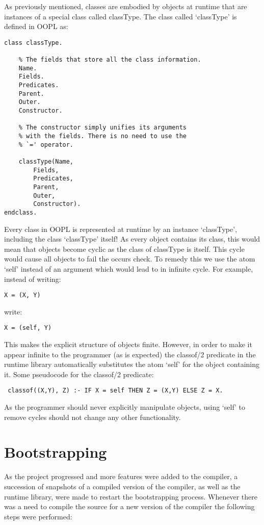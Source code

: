 \documentclass[12pt,a4paper,twoside,openright]{report}
\begin{document}
As previously mentioned, classes are embodied by objects at runtime that are instances of a special class called classType. The class called `classType' is defined in OOPL as:

\begin{lstlisting}
class classType.

	% The fields that store all the class information.
	Name.
	Fields.
	Predicates.
	Parent.
	Outer.
	Constructor.
	
	% The constructor simply unifies its arguments
	% with the fields. There is no need to use the
	% `=' operator.
	
	classType(Name, 
		Fields,
		Predicates,
		Parent,
		Outer,
		Constructor).
endclass.
\end{lstlisting}

\noindent Every class in OOPL is represented at runtime by an instance `classType', including the class `classType' itself! As every object contains its class, this would mean that objects become cyclic as the class of classType is itself. This cycle would cause all objects to fail the occurs check. To remedy this we use the atom `self' instead of an argument which would lead to in infinite cycle. For example, instead of writing:

\begin{lstlisting}
X = (X, Y)
\end{lstlisting}
\noindent write:
\begin{lstlisting}
X = (self, Y)
\end{lstlisting}

\noindent This makes the explicit structure of objects finite. However, in order to make it appear infinite to the programmer (as is expected) the classof/2 predicate in the runtime library automatically substitutes the atom `self' for the object containing it. Some pseudocode for the classof/2 predicate:


\begin{lstlisting}
 classof((X,Y), Z) :- IF X = self THEN Z = (X,Y) ELSE Z = X.
\end{lstlisting} 

\noindent As the programmer should never explicitly manipulate objects, using `self' to remove cycles should not change any other functionality. 

\section{Bootstrapping}

As the project progressed and more features were added to the compiler, a succession of snapshots of a compiled version of the compiler, as well as the runtime library, were made to restart the bootstrapping process. Whenever there was a need to compile the source for a new version of the compiler the following steps were performed:
\end{document}
